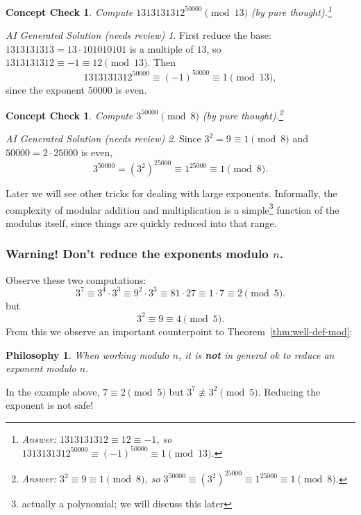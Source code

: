 \documentclass{article}
\theoremstyle{plain}
\newtheorem{checkin}[theorem]{Concept Check}
\newtheorem{philosophy}[theorem]{Philosophy}
\theoremstyle{definition}
\theoremstyle{remark}
\newtheorem*{aisolution}{AI Generated Solution (needs review)}
\numberwithin{theorem}{section}
\begin{document}
\begin{checkin}
    Compute $1313131312^{50000} \pmod{13}$ (by pure thought).\footnote{Answer: $1313131312 \equiv 12 \equiv -1$, so $1313131312^{50000} \equiv (-1)^{50000} \equiv 1 \pmod{13}$.}
\end{checkin}
\begin{aisolution}
First reduce the base: $1313131313 = 13\cdot 101010101$ is a multiple of $13$, so $1313131312 \equiv -1 \equiv 12 \pmod{13}$.  Then
\[
1313131312^{50000} \equiv (-1)^{50000} \equiv 1 \pmod{13},
\]
since the exponent $50000$ is even.
\end{aisolution}

\begin{checkin}
    Compute $3^{50000} \pmod{8}$ (by pure thought).\footnote{Answer: $3^2 \equiv 9 \equiv 1 \pmod{8}$, so $3^{50000} \equiv (3^2)^{25000} \equiv 1^{25000} \equiv 1 \pmod{8}$.}
\end{checkin}
\begin{aisolution}
Since $3^2 = 9 \equiv 1 \pmod 8$ and $50000 = 2\cdot 25000$ is even,
\[
3^{50000} = (3^2)^{25000} \equiv 1^{25000} \equiv 1 \pmod 8.
\]
\end{aisolution}

Later we will see other tricks for dealing with large exponents.  Informally, the complexity of modular addition and multiplication is a simple\footnote{actually a polynomial; we will discuss this later} function of the modulus itself, since things are quickly reduced into that range.

\subsubsection{Warning!  Don't reduce the exponents modulo $n$.}

Observe these two computations:
\[
3^7 \equiv 3^4 \cdot 3^3 \equiv 9^2 \cdot 3^3 \equiv 81 \cdot 27 \equiv 1 \cdot 7 \equiv 2 \pmod{5}.
\]
but
\[
3^2 \equiv 9 \equiv 4 \pmod{5}.
\]
From this we observe an important counterpoint to Theorem~\ref{thm:well-def-mod}:

\begin{philosophy}
    When working modulo $n$, it is \textbf{not} in general ok to reduce an exponent modulo $n$.
\end{philosophy}

In the example above, $7 \equiv 2 \pmod{5}$ but $3^7 \not\equiv 3^2 \pmod{5}$.  Reducing the exponent is not safe!
\end{document}
